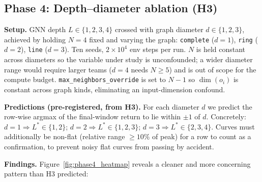 \documentclass[manuscript, screen, review]{jair}
\begin{document}
\subsection{Phase 4: Depth--diameter ablation (H3)}
\label{sec:results:ablation}

\textbf{Setup.} GNN depth $L \in \{1, 2, 3, 4\}$ crossed with graph
diameter $d \in \{1, 2, 3\}$, achieved by holding $N=4$ fixed and
varying the graph: \texttt{complete} ($d=1$), \texttt{ring} ($d=2$),
\texttt{line} ($d=3$). Ten seeds, $2 \times 10^4$ env steps per run.
$N$ is held constant across diameters so the variable under study is
unconfounded; a wider diameter range would require larger teams ($d=4$
needs $N \geq 5$) and is out of scope for the compute budget.
\texttt{max\_neighbors\_override} is set to $N-1$ so $\dim(o_i)$ is
constant across graph kinds, eliminating an input-dimension confound.

\textbf{Predictions (pre-registered, from H3).}
For each diameter $d$ we predict the row-wise argmax of the
final-window return to lie within $\pm 1$ of $d$. Concretely:
$d=1 \Rightarrow L^* \in \{1, 2\}$; $d=2 \Rightarrow L^* \in \{1, 2, 3\}$;
$d=3 \Rightarrow L^* \in \{2, 3, 4\}$. Curves must additionally be non-flat
(relative range $\ge 10\%$ of peak) for a row to count as a confirmation,
to prevent noisy flat curves from passing by accident.



\textbf{Findings.} Figure~\ref{fig:phase4_heatmap} reveals a cleaner and more concerning pattern than H3 predicted:
\end{document}
